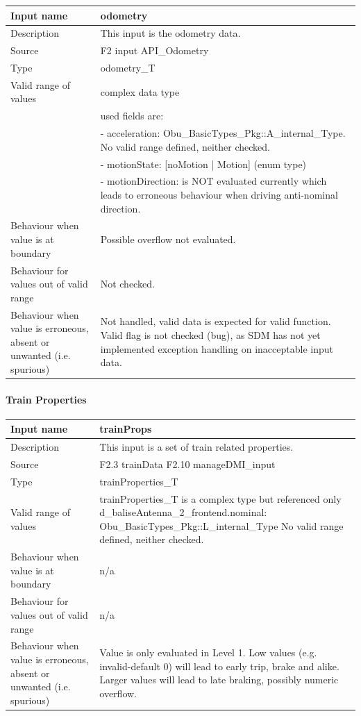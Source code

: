 \begin{longtable}{p{}p{}}
\toprule
Input name				& odometry \\
\midrule
Description				& This input is the odometry data. \\
\midrule
Source					& F2 input API\_Odometry \\ 
\midrule
Type					& odometry\_T \\
\midrule
Valid range of values	& complex data type \\
 & used fields are: \\
 & - acceleration: Obu\_BasicTypes\_Pkg::A\_internal\_Type. No valid range defined, neither checked. \\
 & - motionState: [noMotion | Motion] (enum type) \\
 & - motionDirection: is NOT evaluated currently which leads to erroneous behaviour when driving anti-nominal direction.\\
\midrule
Behaviour when value is at boundary	& Possible overflow not evaluated. \\
\midrule
Behaviour for values out of valid range	& Not checked. \\
\midrule
Behaviour when value is erroneous, absent or unwanted (i.e. spurious) & Not handled, valid data is expected for valid function. Valid flag is not checked (bug), as SDM has not yet implemented exception handling on inacceptable input data.\\
\bottomrule
\end{longtable}


\paragraph{Train Properties}

\begin{longtable}{p{}p{}}
\toprule
Input name				& trainProps \\
\midrule
Description				& This input is a set of train related properties. \\
\midrule
Source					& F2.3 trainData\newline
F2.10 manageDMI\_input \\ 
\midrule
Type					& trainProperties\_T \\
\midrule
Valid range of values	& trainProperties\_T is a complex type but referenced only d\_baliseAntenna\_2\_frontend.nominal: Obu\_BasicTypes\_Pkg::L\_internal\_Type No valid range defined, neither checked. \\
\midrule
Behaviour when value is at boundary	& n/a \\
\midrule
Behaviour for values out of valid range	& n/a \\
\midrule
Behaviour when value is erroneous, absent or unwanted (i.e. spurious) & Value is only evaluated in Level 1. Low values (e.g. invalid-default 0) will lead to early trip, brake and alike. Larger values will lead to late braking, possibly numeric overflow. \\
\bottomrule
\end{longtable}


